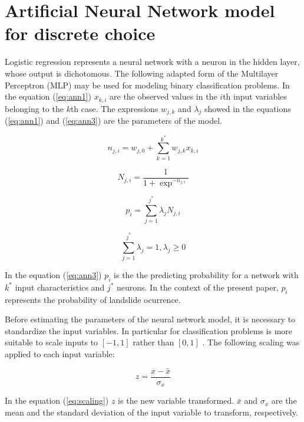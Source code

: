 \documentclass[11pt,twoside]{rmta2010eng}%
\begin{document}
\section{Artificial Neural Network model for discrete choice}
Logistic regression represents a neural network with 
a neuron in the hidden layer, whose output is dichotomous. The following adapted form of the Multilayer Perceptron (MLP) may be used for modeling binary classification problems. In the equation (\ref{eq:ann1}) $x_{k,i}$ are the observed values in the $i$th input variables belonging to the $k$th case. The expressions $w_{j,k}$ and $\lambda_{j}$ showed in the equations (\ref{eq:ann1}) and (\ref{eq:ann3}) are the parameters of the model. 


\begin{equation}
n_{j,i} = w_{j,0} + \sum_{k=1}^{k^{*}} w_{j,k}x_{k,i}
\label{eq:ann1}
\end{equation}

\begin{equation}
N_{j,i} = \frac{1}{1+\exp^{-n_{j,i}}}
\label{eq:ann2}
\end{equation}



\begin{equation}
p_{i} = \sum_{j=1}^{j^{*}} \lambda_{j} N_{j,i}
\label{eq:ann3}
\end{equation}

\begin{equation}
\sum_{j=1}^{j^{*}} \lambda_{j} = 1 , \lambda_{j} \ge 0
\label{eq:ann4}
\end{equation}


In the equation (\ref{eq:ann3}) $p_{i}$ is the the predicting probability for a network with $ k^{*} $ input characteristics and $ j^{*} $ neurons. In the context of the present paper, $p_{i} $ represents the probability of landslide ocurrence.

Before estimating the parameters of the neural network model, it is necessary to standardize the input variables. In particular for classification problems is more suitable to scale inputs to $[-1,1]$ rather than $[0,1]$ \cite{FAQANN}. The following scaling was applied to each input variable: 

\begin{equation}
z = \frac{x - \bar{x} }{\sigma_{x}}
\label{eq:scaling}
\end{equation}

In the equation (\ref{eq:scaling}) $z$ is the new variable transformed. $ \bar{x} $ and $\sigma_{x}$ are the mean and the standard deviation of the input variable to transform, respectively.  
\end{document}
